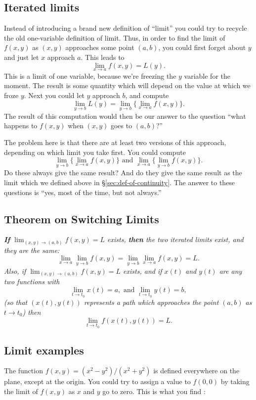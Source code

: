 \subsection{Iterated limits} Instead of introducing a brand new %
definition of ``limit'' you could try to recycle the old one-variable
definition of limit.  Thus, in order to find the limit of $f(x, y)$ as
$(x,y)$ approaches some point $(a,b)$, you could first forget about
$y$ and just let $x$ approach $a$.  This leads to
\[
\lim_{x\to a}f(x, y)  = L(y).
\]
This is a limit of one variable, because we're freezing the $y$
variable for the moment.  The result is some quantity which will
depend on the value at which we froze $y$.  Next you could let
$y$ approach $b$, and compute
\[
\lim_{y\to b} L(y) = \lim_{y\to b}\bigl\{\lim_{x\to a}f(x, y)\bigr\}.
\]
The result of this computation would then be our answer to the question
``what happens to $f(x, y)$ when $(x, y)$ goes to $(a, b)$?''

The problem here is that there are at least two versions of this
approach, depending on which limit you take first. You could compute
\[
\lim_{y\to b}\bigl\{\lim_{x\to a}f(x, y)\bigr\}
\text{ and }
\lim_{x\to a}\bigl\{\lim_{y\to b}f(x, y)\bigr\}.
\]
Do these always give the same result?  And do they give the same
result as the limit which we defined above in
\S\ref{sec:def-of-continuity}.  The answer to these questions is
``yes, most of the time, but not always.''

\subsection{Theorem on Switching Limits}\label{sec:01switching-limits} %
\itshape \textbf{If} $\lim_{(x,y)\to (a, b)} f(x, y) = L$ exists,
\textbf{then} the two iterated limits exist, and they are the same:
\[
\lim_{x\to a}\lim_{y\to b} f(x,y) = \lim_{y\to b}\lim_{x\to a} f(x,y)
= L.
\]
Also, if $\lim_{(x,y)\to (a, b)} f(x, y) = L$ exists, and if $x(t)$
and $y(t)$ are any two functions with
\[
\lim_{t\to t_0} x(t) = a, \text{ and }
\lim_{t\to t_0} y(t) = b,
\]
(so that $(x(t),y(t))$ represents a path which approaches the point
$(a,b)$ as $t\to t_0$) then
\[
\lim_{t\to t_0}f(x(t), y(t)) = L.
\]

\upshape

\subsection{Limit examples} %
\label{sec:limit-examples}
The function $f(x, y) = (x^2-y^2) / (x^2+y^2)$ is defined everywhere
on the plane, except at the origin.  You could try to assign a value
to $f(0,0)$ by taking the limit of $f(x,y)$ as $x$ and $y$ go to zero.
This is what you find :

